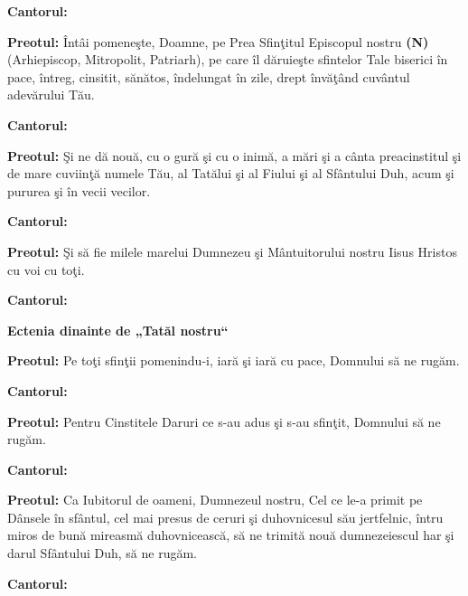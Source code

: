 \documentclass[11pt,letterpaper]{book} \usepackage{ucs}
\newcommand{\mysection}[1]{\begin{center}{\Large \bf #1}\end{center}}
\begin{document}
  {\bf Cantorul:}
  \pagebreak


  {\bf Preotul:} Întâi pomeneşte, Doamne, pe Prea Sfinţitul Episcopul
  nostru {\bf (N)} (Arhiepiscop, Mitropolit, Patriarh), pe care îl
  dăruieşte sfintelor Tale biserici în pace, întreg, cinsitit,
  sănătos, îndelungat în zile, drept învăţând cuvântul adevărului Tău.

  {\bf Cantorul:}
  \begin{center}
  \end{center}

  {\bf Preotul:} Şi ne dă nouă, cu o gură şi cu o inimă, a mări şi a
  cânta preacinstitul şi de mare cuviinţă numele Tău, al Tatălui şi al
  Fiului şi al Sfântului Duh, acum şi pururea şi în vecii vecilor.

  {\bf Cantorul:}
  \begin{center}
  \end{center}

  {\bf Preotul:} Şi să fie milele marelui Dumnezeu şi Mântuitorului
  nostru Iisus Hristos cu voi cu toţi.

  {\bf Cantorul:}
  \begin{center}
  \end{center}

  \mysection{Ectenia dinainte de „Tatăl nostru“}

  {\bf Preotul:} Pe toţi sfinţii pomenindu-i, iară şi iară cu pace,
  Domnului să ne rugăm.

  {\bf Cantorul:}
  \begin{center}
  \end{center}

  {\bf Preotul:} Pentru Cinstitele Daruri ce s-au adus şi s-au
  sfinţit, Domnului să ne rugăm.

  {\bf Cantorul:}
  \begin{center}
  \end{center}

  {\bf Preotul:} Ca Iubitorul de oameni, Dumnezeul nostru, Cel ce le-a
  primit pe Dânsele în sfântul, cel mai presus de ceruri şi
  duhovnicesul său jertfelnic, întru miros de bună mireasmă
  duhovnicească, să ne trimită nouă dumnezeiescul har şi darul
  Sfântului Duh, să ne rugăm.

  {\bf Cantorul:}
  \begin{center}
  \end{center}
\end{document}
